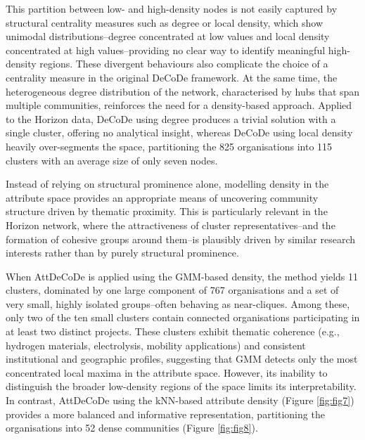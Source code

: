 \documentclass[11pt]{article}
\begin{document}
This partition between low- and high-density nodes is not easily captured by structural centrality measures such as degree or local density, which show unimodal distributions--degree concentrated at low values and local density concentrated at high values--providing no clear way to identify meaningful high-density regions. These divergent behaviours also complicate the choice of a centrality measure in the original DeCoDe framework. 
At the same time, the heterogeneous degree distribution of the network, characterised by hubs that span multiple communities, reinforces the need for a density-based approach.
Applied to the Horizon data, DeCoDe using degree produces a trivial solution with a single cluster, offering no analytical insight, whereas DeCoDe using local density heavily over-segments the space, partitioning the 825 organisations into 115 clusters with an average size of only seven nodes.

Instead of relying on structural prominence alone, modelling density in the attribute space provides an appropriate means of uncovering community structure driven by thematic proximity. This is particularly relevant in the Horizon network, where the attractiveness of cluster representatives--and the formation of cohesive groups around them--is plausibly driven by similar research interests rather than by purely structural prominence.

When AttDeCoDe is applied using the GMM-based density, the method yields 11 clusters, dominated by one large component of 767 organisations and a set of very small, highly isolated groups--often behaving as near-cliques. Among these, only two of the ten small clusters contain connected organisations participating in at least two distinct projects. These clusters exhibit thematic coherence (e.g., hydrogen materials, electrolysis, mobility applications) and consistent institutional and geographic profiles, suggesting that GMM detects only the most concentrated local maxima in the attribute space. However, its inability to distinguish the broader low-density regions of the space limits its interpretability. In contrast, AttDeCoDe using the kNN-based attribute density (Figure \ref{fig:fig7}) provides a more balanced and informative representation, partitioning the organisations into 52 dense communities (Figure \ref{fig:fig8}).
\end{document}
